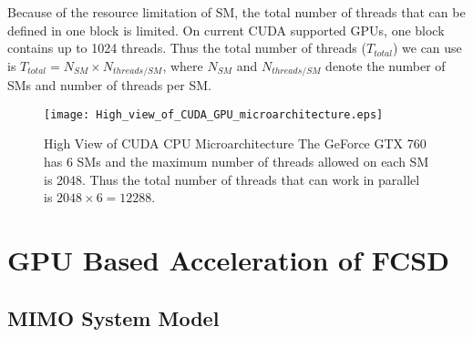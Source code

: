\documentclass[letterpaper, 10pt, conference]{ieeeconf}
\begin{document}
Because of the resource limitation of SM, the total number of threads that can be defined in one block is limited. On current CUDA supported GPUs, one block contains up to 1024 threads. Thus the total number of threads ($T_{total}$) we can use is $T_{total}=N_{SM}\times N_{threads/SM} $, where $N_{SM}$ and $N_{threads/SM}$ denote the number of SMs and number of threads per SM.  
\begin{figure}[htb]
\centering
\texttt{[image: High\_view\_of\_CUDA\_GPU\_microarchitecture.eps]}
\caption{ High View of CUDA CPU Microarchitecture
The GeForce GTX 760 has 6 SMs and the maximum number of threads allowed on each SM is 2048. Thus the total number of threads that can work in parallel is $2048\times 6=12288$.
}
\label{figure2}
\end{figure}   
\section{GPU Based Acceleration of FCSD}\label{GPUFCSD}
\subsection{MIMO System Model}\label{system}
\end{document}
